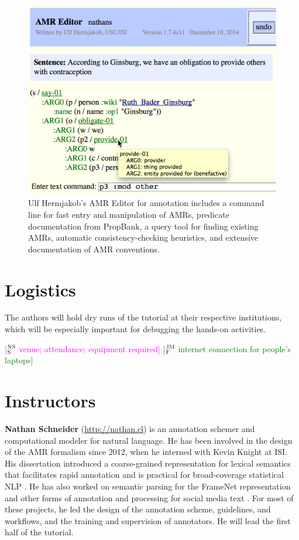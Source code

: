 \documentclass[11pt,letterpaper]{article}
\newcommand{\ensuretext}[1]{#1}
\newcommand{\jmfmarker}{\ensuretext{\textcolor{green}{\ensuremath{^{\textsc{JM}}_{\textsc{F}}}}}}
\newcommand{\nssmarker}{\ensuretext{\textcolor{magenta}{\ensuremath{^{\textsc{NS}}_{\textsc{S}}}}}}
\newcommand{\arkcomment}[3]{\ensuretext{\textcolor{#3}{[#1 #2]}}}
\newcommand{\jmf}[1]{\arkcomment{\jmfmarker}{#1}{green}}
\newcommand{\nss}[1]{\arkcomment{\nssmarker}{#1}{magenta}}
\begin{document}
\begin{figure}\centering
\includegraphics[width=\columnwidth]{editor_zoomed.png}
\caption{Ulf Hermjakob's AMR Editor for annotation includes a command line for fast entry and manipulation of AMRs, 
predicate documentation from PropBank, a query tool for finding existing AMRs, automatic consistency-checking heuristics, 
and extensive documentation of AMR conventions.}
\label{fig:editor}
\end{figure}

\section{Logistics}

The authors will hold dry runs of the tutorial at their respective institutions, 
which will be especially important for debugging the hands-on activities. 

\nss{venue; attendance; equipment required}
\jmf{internet connection for people's laptops}

\section{Instructors}

\textbf{Nathan Schneider} (\url{http://nathan.cl}) is an annotation schemer and computational modeler for natural language. 
He has been involved in the design of the AMR formalism since 2012, 
when he interned with Kevin Knight at ISI. 
His dissertation introduced a coarse-grained representation for lexical semantics that facilitates rapid annotation 
and is practical for broad-coverage statistical NLP \citep{schneider-thesis}. 
He has also worked on semantic parsing for the FrameNet representation \citep{das-14} 
and other forms of annotation and processing for social media text \citep{gimpel-11,owoputi-13,schneider-13,kong-14,mohit-12}.
For most of these projects, he led the design of the annotation scheme, guidelines, and workflows, 
and the training and supervision of annotators.
He will lead the first half of the tutorial.\\[-5pt]
\end{document}
